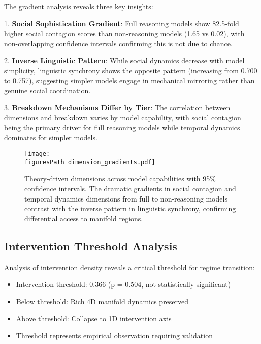 \documentclass[11pt,letterpaper]{article}
\newcommand{\interventionThreshold}{0.366}
\newcommand{\interventionThresholdPValue}{0.504}
\newcommand{\socialContagionFullMean}{1.65}
\newcommand{\socialContagionNoMean}{0.02}
\newcommand{\fullLinguisticAlignment}{0.700}
\newcommand{\nonLinguisticAlignment}{0.757}
\newcommand{\figuresPath}{../analysis/rigorous_analysis_outputs/figures/}
\begin{document}
The gradient analysis reveals three key insights:

1. \textbf{Social Sophistication Gradient}: Full reasoning models show 82.5-fold higher social contagion scores than non-reasoning models (\socialContagionFullMean{} vs \socialContagionNoMean{}), with non-overlapping confidence intervals confirming this is not due to chance.

2. \textbf{Inverse Linguistic Pattern}: While social dynamics decrease with model simplicity, linguistic synchrony shows the opposite pattern (increasing from \fullLinguisticAlignment{} to \nonLinguisticAlignment{}), suggesting simpler models engage in mechanical mirroring rather than genuine social coordination.

3. \textbf{Breakdown Mechanisms Differ by Tier}: The correlation between dimensions and breakdown varies by model capability, with social contagion being the primary driver for full reasoning models while temporal dynamics dominates for simpler models.

\begin{figure}[htbp]
\centering
\texttt{[image: \\figuresPath dimension\_gradients.pdf]}
\caption{Theory-driven dimensions across model capabilities with 95\% confidence intervals. The dramatic gradients in social contagion and temporal dynamics dimensions from full to non-reasoning models contrast with the inverse pattern in linguistic synchrony, confirming differential access to manifold regions.}
\label{fig:dimension_gradients}
\end{figure}

\subsection{Intervention Threshold Analysis}

Analysis of intervention density reveals a critical threshold for regime transition:

\begin{itemize}
    \item Intervention threshold: \interventionThreshold{} (p = \interventionThresholdPValue{}, not statistically significant)
    \item Below threshold: Rich 4D manifold dynamics preserved
    \item Above threshold: Collapse to 1D intervention axis
    \item Threshold represents empirical observation requiring validation
\end{itemize}
\end{document}
